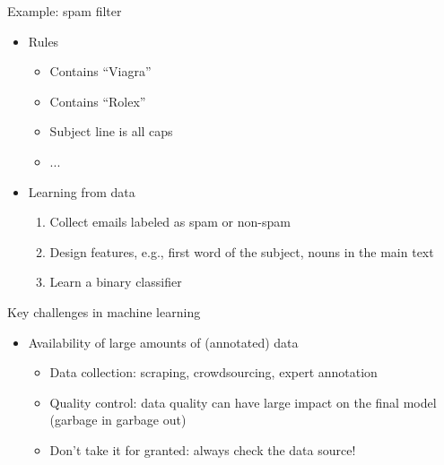 \documentclass[usenames,dvipsnames,notes,11pt,aspectratio=169]{beamer}
\begin{document}
\begin{frame}
    {Example: spam filter}
    
    \begin{itemize}
        \itemsep1em
        \item Rules
            \begin{itemize}
                \item[] Contains ``Viagra''
                \item[] Contains ``Rolex''
                \item[] Subject line is all caps
                \item[] ... 
            \end{itemize}
        \item Learning from data
            \begin{enumerate}
                \item Collect emails labeled as spam or non-spam 
                \item Design features, e.g., first word of the subject, nouns in the main text
                \item Learn a binary classifier 
            \end{enumerate}
    \end{itemize}
    \medskip\pause
\end{frame}

\begin{frame}
    {Key challenges in machine learning}
    \begin{itemize}
        \itemsep1em
        \item Availability of large amounts of (annotated) data
            \begin{itemize}
                \item Data collection: scraping, crowdsourcing, expert annotation
                \item Quality control: data quality can have large impact on the final model (garbage in garbage out)
                \item Don't take it for granted: always check the data source!
            \end{itemize}
    \end{itemize}
    \medskip\pause
\end{frame}
\end{document}
